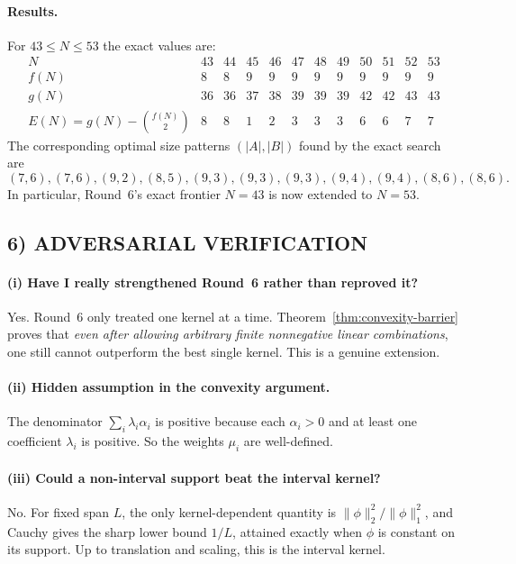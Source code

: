 \paragraph{Results.}
For $43\le N\le 53$ the exact values are:
\[
\begin{array}{c|ccccccccccc}
N & 43&44&45&46&47&48&49&50&51&52&53\\\hline
f(N)&8&8&9&9&9&9&9&9&9&9&9\\
g(N)&36&36&37&38&39&39&39&42&42&43&43\\
E(N)=g(N)-\binom{f(N)}2&8&8&1&2&3&3&3&6&6&7&7
\end{array}
\]
The corresponding optimal size patterns $(|A|,|B|)$ found by the exact search are
\[
(7,6),(7,6),(9,2),(8,5),(9,3),(9,3),(9,3),(9,4),(9,4),(8,6),(8,6).
\]
In particular, Round~6's exact frontier $N=43$ is now extended to $N=53$.

\subsection{6) ADVERSARIAL VERIFICATION}

\paragraph{(i) Have I really strengthened Round~6 rather than reproved it?}
Yes.  Round~6 only treated one kernel at a time.  Theorem~\ref{thm:convexity-barrier} proves that \emph{even after allowing arbitrary finite nonnegative linear combinations}, one still cannot outperform the best single kernel.  This is a genuine extension.

\paragraph{(ii) Hidden assumption in the convexity argument.}
The denominator $\sum_i\lambda_i\alpha_i$ is positive because each $\alpha_i>0$ and at least one coefficient $\lambda_i$ is positive.  So the weights $\mu_i$ are well-defined.

\paragraph{(iii) Could a non-interval support beat the interval kernel?}
No.  For fixed span $L$, the only kernel-dependent quantity is $\|\phi\|_2^2/\|\phi\|_1^2$, and Cauchy gives the sharp lower bound $1/L$, attained exactly when $\phi$ is constant on its support.  Up to translation and scaling, this is the interval kernel.

